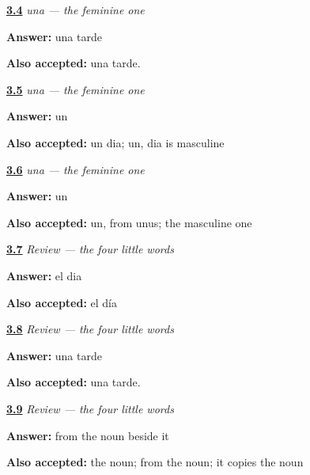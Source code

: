 \noindent\begin{minipage}[t]{\linewidth}
\raggedright
\hyperlink{review-ES-C02-una-tarde}{\textbf{3.4}} \emph{una — the feminine one}\par
\small \textbf{Answer:} una tarde\par
\footnotesize \textbf{Also accepted:} una tarde.
\end{minipage}\par\medskip

\noindent\begin{minipage}[t]{\linewidth}
\raggedright
\hyperlink{review-ES-C02-una-which}{\textbf{3.5}} \emph{una — the feminine one}\par
\small \textbf{Answer:} un\par
\footnotesize \textbf{Also accepted:} un dia; un, dia is masculine
\end{minipage}\par\medskip

\noindent\begin{minipage}[t]{\linewidth}
\raggedright
\hyperlink{review-ES-C02-una-worn}{\textbf{3.6}} \emph{una — the feminine one}\par
\small \textbf{Answer:} un\par
\footnotesize \textbf{Also accepted:} un, from unus; the masculine one
\end{minipage}\par\medskip

\noindent\begin{minipage}[t]{\linewidth}
\raggedright
\hyperlink{review-ES-C02-repaso-articulos-the-day}{\textbf{3.7}} \emph{Review — the four little words}\par
\small \textbf{Answer:} el dia\par
\footnotesize \textbf{Also accepted:} el día
\end{minipage}\par\medskip

\noindent\begin{minipage}[t]{\linewidth}
\raggedright
\hyperlink{review-ES-C02-repaso-articulos-an-afternoon}{\textbf{3.8}} \emph{Review — the four little words}\par
\small \textbf{Answer:} una tarde\par
\footnotesize \textbf{Also accepted:} una tarde.
\end{minipage}\par\medskip

\noindent\begin{minipage}[t]{\linewidth}
\raggedright
\hyperlink{review-ES-C02-repaso-articulos-where}{\textbf{3.9}} \emph{Review — the four little words}\par
\small \textbf{Answer:} from the noun beside it\par
\footnotesize \textbf{Also accepted:} the noun; from the noun; it copies the noun
\end{minipage}\par\medskip

